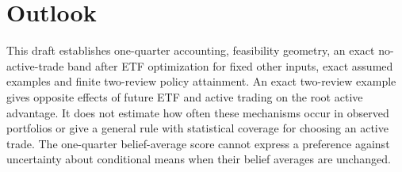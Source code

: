 \documentclass[11pt]{article}
\begin{document}
\section{Outlook}\label{sec:5}

This draft establishes one-quarter accounting, feasibility geometry,
an exact no-active-trade band after ETF optimization for fixed other
inputs, exact assumed examples and finite two-review policy
attainment. An exact two-review example gives opposite effects of
future ETF and active trading on the root active advantage. It
does not estimate how often these mechanisms occur in observed
portfolios or give a
general rule with statistical coverage for choosing an active trade.
The one-quarter belief-average score cannot express a preference
against uncertainty about conditional means when their belief
averages are unchanged.
\end{document}
